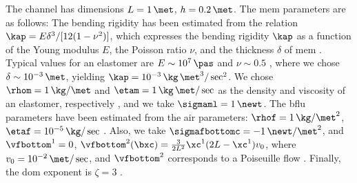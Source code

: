 The  channel has dimensions $L = 1 \, \met$, $h = 0.2 \, \met$.
The \ac{mem} parameters are as follows: The bending rigidity has been estimated from the relation $\kap = E \delta^3/[12(1-\nu^2)]$, which expresses the bending rigidity $\kap$ as a function of the Young modulus $E$, the Poisson ratio $\nu$, and the thickness $\delta$ of  \ac{mem} \cite{landauTheoryElasticity1986}. Typical values for an elastomer   are $E \sim 10^7 \, \pas$ \cite{fengPreparationCharacterizationSilicone2017} and $\nu \sim 0.5$ \cite{mullerQuickAccurateMethod2019}, where we chose $\delta \sim 10^{-3}\, \met$, yielding $\kap = 10^{-3} \, \kg \, \met^3/\sec^2$.
We chose $\rhom = 1 \, \kg /  \met$ and $\etam = 1 \, \kg\, \met /\sec $ as the density and viscosity of an elastomer, respectively \cite{caiSoftPolydimethylsiloxaneElastomers2015,pochivalovDevelopmentVibrationDamping2021},  and we take $\sigmaml = 1 \, \newt$.
The \ac{bflu} parameters have been estimated from the air parameters:  $\rhof = 1 \, \kg/\met^2$, $\etaf = 10^{-5} \, \kg / \sec$ \cite{hilsenrath1955tables}.
Also, we take $\sigmafbottomc = - 1 \, \newt / \met^2$,
and $\vfbottom^1 =0$, $\vfbottom^2(\bxc) =  \frac{3}{2 L^2}  \xc^1 (2 L -\xc^1) v_0$, where $v_0 = 10^{-2}  \, \met / \sec$, and $\vfbottom^2$ corresponds to a Poiseuille flow \cite{landauFluidMechanics1987}.  Finally, the \ac{dom} exponent is $\zeta = 3$ \cite{kamenskyLectureNotesMAE}.

